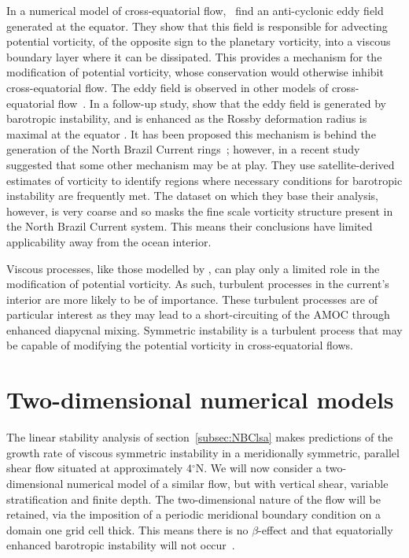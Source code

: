 In a numerical model of cross-equatorial flow,~\citet{Edwards1998I} find an anti-cyclonic eddy field generated at the equator. They show that this field is responsible for advecting potential vorticity, of the opposite sign to the planetary vorticity, into a viscous boundary layer where it can be dissipated. This provides a mechanism for the modification of potential vorticity, whose conservation would otherwise inhibit cross-equatorial flow. The eddy field is observed in other models of cross-equatorial flow~\citep[e.g.][]{Jochum2003, Goes2009}. In a follow-up study, \citet{Edwards1998II} show that the eddy field is generated by barotropic instability, and is enhanced as the Rossby deformation radius is maximal at the equator \citep{Chelton1998}. It has been proposed this mechanism is behind the generation of the North Brazil Current rings~\citep{Jochum2003}; however, in a recent study \citet{Aguedjou2019} suggested that some other mechanism may be at play. They use satellite-derived estimates of vorticity to identify regions where necessary conditions for barotropic instability are frequently met. The dataset on which they base their analysis, however, is very coarse and so masks the fine scale vorticity structure present in the North Brazil Current system. This means their conclusions have limited applicability away from the ocean interior.

Viscous processes, like those modelled by \citet{Edwards1998I}, can play only a limited role in the modification of potential vorticity. As such, turbulent processes in the current's interior are more likely to be of importance. These turbulent processes are of particular interest as they may lead to a short-circuiting of the AMOC through enhanced diapycnal mixing. Symmetric instability is a turbulent process that may be capable of modifying the potential vorticity in cross-equatorial flows.

\section{Two-dimensional numerical models}
\label{sec:2DModels}
The linear stability analysis of section~\ref{subsec:NBClsa} makes predictions of the growth rate of viscous symmetric instability in a meridionally symmetric, parallel shear flow situated at approximately 4$^\circ$N. We will now consider a two-dimensional numerical model of a similar flow, but with vertical shear, variable stratification and finite depth. The two-dimensional nature of the flow will be retained, via the imposition of a periodic meridional boundary condition on a domain one grid cell thick. This means there is no $\beta$-effect and that equatorially enhanced barotropic instability will not occur~\citep{Edwards1998I, Edwards1998II}.

